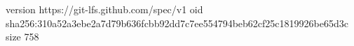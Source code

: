 version https://git-lfs.github.com/spec/v1
oid sha256:310a52a3ebe2a7d79b636fcbb92dd7c7ee554794beb62cf25c1819926be65d3c
size 758
